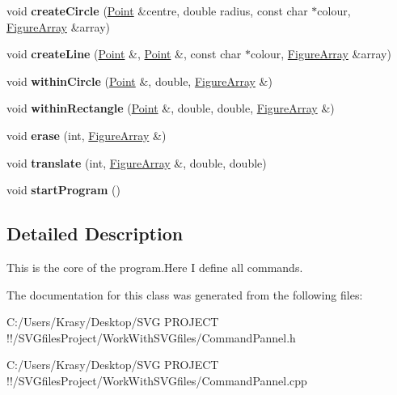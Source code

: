 \begin{DoxyCompactItemize}
\item 
\mbox{\label{class_command_pannel_aa298bf4795a5a4fa9c95414822d5a2c9}} 
void {\bfseries create\+Circle} (\mbox{\hyperlink{struct_point}{Point}} \&centre, double radius, const char $\ast$colour, \mbox{\hyperlink{class_figure_array}{Figure\+Array}} \&array)
\item 
\mbox{\label{class_command_pannel_ad0df34b07a5d0c3e165ef82011c22b57}} 
void {\bfseries create\+Line} (\mbox{\hyperlink{struct_point}{Point}} \&, \mbox{\hyperlink{struct_point}{Point}} \&, const char $\ast$colour, \mbox{\hyperlink{class_figure_array}{Figure\+Array}} \&array)
\item 
\mbox{\label{class_command_pannel_aa066fb35efbb949ffbe3cc97a96114fa}} 
void {\bfseries within\+Circle} (\mbox{\hyperlink{struct_point}{Point}} \&, double, \mbox{\hyperlink{class_figure_array}{Figure\+Array}} \&)
\item 
\mbox{\label{class_command_pannel_a9697185be8d63c540426ee9a6a1c1fa0}} 
void {\bfseries within\+Rectangle} (\mbox{\hyperlink{struct_point}{Point}} \&, double, double, \mbox{\hyperlink{class_figure_array}{Figure\+Array}} \&)
\item 
\mbox{\label{class_command_pannel_a7b38972499a4e86ebfe71de9d1321bae}} 
void {\bfseries erase} (int, \mbox{\hyperlink{class_figure_array}{Figure\+Array}} \&)
\item 
\mbox{\label{class_command_pannel_a55e07ccbdd9c1c9e0fbae711c9d693d9}} 
void {\bfseries translate} (int, \mbox{\hyperlink{class_figure_array}{Figure\+Array}} \&, double, double)
\item 
\mbox{\label{class_command_pannel_af5b2cc5f564e40f6044101667ac4c9af}} 
void {\bfseries start\+Program} ()
\end{DoxyCompactItemize}


\subsection{Detailed Description}
This is the core of the program.\+Here I define all commands. 

The documentation for this class was generated from the following files\+:\begin{DoxyCompactItemize}
\item 
C\+:/\+Users/\+Krasy/\+Desktop/\+S\+V\+G P\+R\+O\+J\+E\+C\+T !!/\+S\+V\+Gfiles\+Project/\+Work\+With\+S\+V\+Gfiles/Command\+Pannel.\+h\item 
C\+:/\+Users/\+Krasy/\+Desktop/\+S\+V\+G P\+R\+O\+J\+E\+C\+T !!/\+S\+V\+Gfiles\+Project/\+Work\+With\+S\+V\+Gfiles/Command\+Pannel.\+cpp\end{DoxyCompactItemize}
